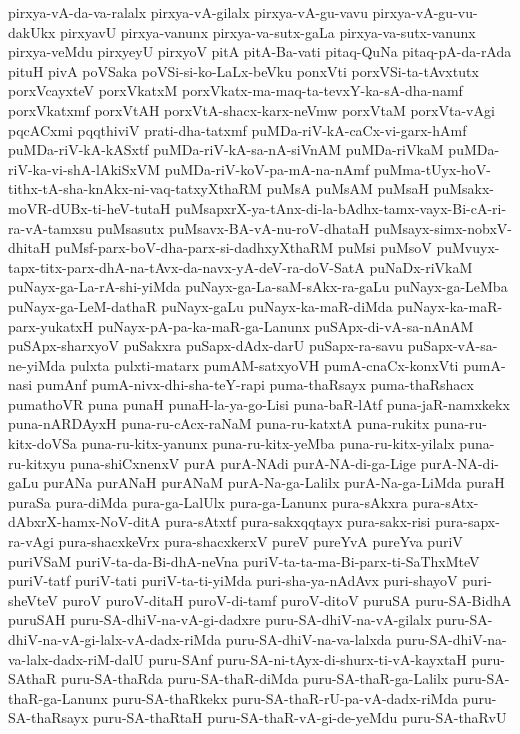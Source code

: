 {pirxya-vA-da-va-ralalx
pirxya-vA-gilalx
pirxya-vA-gu-vavu
pirxya-vA-gu-vu-dakUkx
pirxyavU
pirxya-vanunx
pirxya-va-sutx-gaLa
pirxya-va-sutx-vanunx
pirxya-veMdu
pirxyeyU
pirxyoV
pitA
pitA-Ba-vati
pitaq-QuNa
pitaq-pA-da-rAda
pituH
pivA
poVSaka
poVSi-si-ko-LaLx-beVku
ponxVti
porxVSi-ta-tAvxtutx
porxVcayxteV
porxVkatxM
porxVkatx-ma-maq-ta-tevxY-ka-sA-dha-namf
porxVkatxmf
porxVtAH
porxVtA-shacx-karx-neVmw
porxVtaM
porxVta-vAgi
pqcACxmi
pqqthiviV
prati-dha-tatxmf
puMDa-riV-kA-caCx-vi-garx-hAmf
puMDa-riV-kA-kASxtf
puMDa-riV-kA-sa-nA-siVnAM
puMDa-riVkaM
puMDa-riV-ka-vi-shA-lAkiSxVM
puMDa-riV-koV-pa-mA-na-nAmf
puMma-tUyx-hoV-tithx-tA-sha-knAkx-ni-vaq-tatxyXthaRM
puMsA
puMsAM
puMsaH
puMsakx-moVR-dUBx-ti-heV-tutaH
puMsapxrX-ya-tAnx-di-la-bAdhx-tamx-vayx-Bi-cA-ri-ra-vA-tamxsu
puMsasutx
puMsavx-BA-vA-nu-roV-dhataH
puMsayx-simx-nobxV-dhitaH
puMsf-parx-boV-dha-parx-si-dadhxyXthaRM
puMsi
puMsoV
puMvuyx-tapx-titx-parx-dhA-na-tAvx-da-navx-yA-deV-ra-doV-SatA
puNaDx-riVkaM
puNayx-ga-La-rA-shi-yiMda
puNayx-ga-La-saM-sAkx-ra-gaLu
puNayx-ga-LeMba
puNayx-ga-LeM-dathaR
puNayx-gaLu
puNayx-ka-maR-diMda
puNayx-ka-maR-parx-yukatxH
puNayx-pA-pa-ka-maR-ga-Lanunx
puSApx-di-vA-sa-nAnAM
puSApx-sharxyoV
puSakxra
puSapx-dAdx-darU
puSapx-ra-savu
puSapx-vA-sa-ne-yiMda
pulxta
pulxti-matarx
pumAM-satxyoVH
pumA-cnaCx-konxVti
pumA-nasi
pumAnf
pumA-nivx-dhi-sha-teY-rapi
puma-thaRsayx
puma-thaRshacx
pumathoVR
puna
punaH
punaH-la-ya-go-Lisi
puna-baR-lAtf
puna-jaR-namxkekx
puna-nARDAyxH
puna-ru-cAcx-raNaM
puna-ru-katxtA
puna-rukitx
puna-ru-kitx-doVSa
puna-ru-kitx-yanunx
puna-ru-kitx-yeMba
puna-ru-kitx-yilalx
puna-ru-kitxyu
puna-shiCxnenxV
purA
purA-NAdi
purA-NA-di-ga-Lige
purA-NA-di-gaLu
purANa
purANaH
purANaM
purA-Na-ga-Lalilx
purA-Na-ga-LiMda
puraH
puraSa
pura-diMda
pura-ga-LalUlx
pura-ga-Lanunx
pura-sAkxra
pura-sAtx-dAbxrX-hamx-NoV-ditA
pura-sAtxtf
pura-sakxqqtayx
pura-sakx-risi
pura-sapx-ra-vAgi
pura-shacxkeVrx
pura-shacxkerxV
pureV
pureYvA
pureYva
puriV
puriVSaM
puriV-ta-da-Bi-dhA-neVna
puriV-ta-ta-ma-Bi-parx-ti-SaThxMteV
puriV-tatf
puriV-tati
puriV-ta-ti-yiMda
puri-sha-ya-nAdAvx
puri-shayoV
puri-sheVteV
puroV
puroV-ditaH
puroV-di-tamf
puroV-ditoV
puruSA
puru-SA-BidhA
puruSAH
puru-SA-dhiV-na-vA-gi-dadxre
puru-SA-dhiV-na-vA-gilalx
puru-SA-dhiV-na-vA-gi-lalx-vA-dadx-riMda
puru-SA-dhiV-na-va-lalxda
puru-SA-dhiV-na-va-lalx-dadx-riM-dalU
puru-SAnf
puru-SA-ni-tAyx-di-shurx-ti-vA-kayxtaH
puru-SAthaR
puru-SA-thaRda
puru-SA-thaR-diMda
puru-SA-thaR-ga-Lalilx
puru-SA-thaR-ga-Lanunx
puru-SA-thaRkekx
puru-SA-thaR-rU-pa-vA-dadx-riMda
puru-SA-thaRsayx
puru-SA-thaRtaH
puru-SA-thaR-vA-gi-de-yeMdu
puru-SA-thaRvU
}
